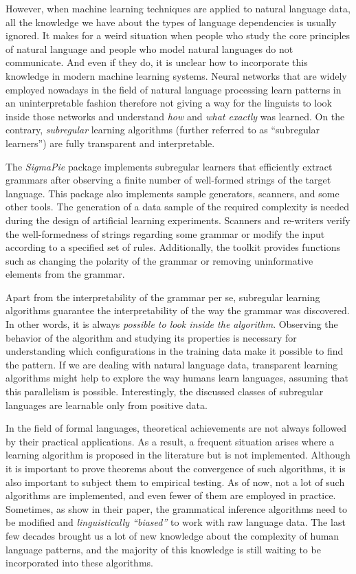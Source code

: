 However, when machine learning techniques are applied to natural language data, all the knowledge we have about the types of language dependencies is usually ignored.
It makes for a weird situation when people who study the core principles of natural language and people who model natural languages do not communicate.
And even if they do, it is unclear how to incorporate this knowledge in modern machine learning systems.
Neural networks that are widely employed nowadays in the field of natural language processing learn patterns in an uninterpretable fashion therefore not giving a way for the linguists to look inside those networks and understand \emph{how} and \emph{what exactly} was learned.
On the contrary, \emph{subregular} learning algorithms (further referred to as ``subregular learners'') are fully transparent and interpretable.


The \emph{SigmaPie} package implements subregular learners that efficiently extract grammars after observing a finite number of well-formed strings of the target language.
This package also implements sample generators, scanners, and some other tools.
The generation of a data sample of the required complexity is needed during the design of artificial learning experiments.
Scanners and re-writers verify the well-formedness of strings regarding some grammar or modify the input according to a specified set of rules.
Additionally, the toolkit provides functions such as changing the polarity of the grammar or removing uninformative elements from the grammar.


Apart from the interpretability of the grammar per se, subregular learning algorithms guarantee the interpretability of the way the grammar was discovered.
In other words, it is always \emph{possible to look inside the algorithm}.
Observing the behavior of the algorithm and studying its properties is necessary for understanding which configurations in the training data make it possible to find the pattern.
If we are dealing with natural language data, transparent learning algorithms might help to explore the way humans learn languages, assuming that this parallelism is possible.
Interestingly, the discussed classes of subregular languages are learnable only from positive data.


In the field of formal languages, theoretical achievements are not always followed by their practical applications.
As a result, a frequent situation arises where a learning algorithm is proposed in the literature but is not implemented.
Although it is important to prove theorems about the convergence of such algorithms, it is also important to subject them to empirical testing.
As of now, not a lot of such algorithms are implemented, and even fewer of them are employed in practice.
Sometimes, as \cite{GildeaJurafsky1996} show in their paper, the grammatical inference algorithms need to be modified and \emph{linguistically ``biased''} to work with raw language data.
The last few decades brought us a lot of new knowledge about the complexity of human language patterns, and the majority of this knowledge is still waiting to be incorporated into these algorithms.


